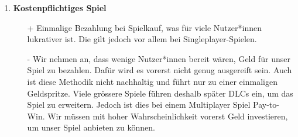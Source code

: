 \begin{itemize}
\begin{enumerate}
\begin{itemize}
        \end{itemize}
        \item \textbf{Kostenpflichtiges Spiel}
        \begin{itemize}
            \item[+] Einmalige Bezahlung bei Spielkauf, was für viele Nutzer*innen lukrativer ist. Die gilt jedoch vor allem bei \gls{Singleplayer}-Spielen.
            \item[-] Wir nehmen an, dass wenige Nutzer*innen bereit wären, Geld für unser Spiel zu bezahlen.
                    Dafür wird es vorerst nicht genug ausgereift sein.
                    Auch ist diese Methodik nicht nachhaltig und führt nur zu einer einmaligen Geldspritze.
                    Viele grössere Spiele führen deshalb später
                    \glspl{DLC} ein, um das Spiel zu erweitern.
                    Jedoch ist dies bei einem Multiplayer Spiel Pay-to-Win.
                    Wir müssen mit hoher Wahrscheinlichkeit vorerst Geld investieren, um unser Spiel anbieten zu können.
        \end{itemize}
    \end{enumerate}
\end{itemize}

